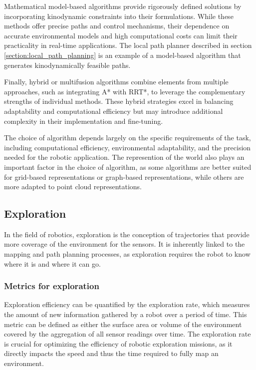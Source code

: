 \documentclass[12pt]{article}
\begin{document}
        Mathematical model-based algorithms provide rigorously defined solutions by incorporating kinodynamic constraints into their formulations. While these methods offer precise paths and control mechanisms, their dependence on accurate environmental models and high computational costs can limit their practicality in real-time applications. The local path planner described in section \ref{section:local_path_planning} is an example of a model-based algorithm that generates kinodynamically feasible paths.
        
        Finally, hybrid or multifusion algorithms combine elements from multiple approaches, such as integrating A* with RRT*, to leverage the complementary strengths of individual methods. These hybrid strategies excel in balancing adaptability and computational efficiency but may introduce additional complexity in their implementation and fine-tuning.
        
        The choice of algorithm depends largely on the specific requirements of the task, including computational efficiency, environmental adaptability, and the precision needed for the robotic application. The represention of the world also plays an important factor in the choice of algorithm, as some algorithms are better suited for grid-based representations or graph-based representations, while others are more adapted to point cloud representations.
        

        

    \subsection{Exploration}

        In the field of robotics, exploration is the conception of trajectories that provide more coverage of the environment for the sensors. It is inherently linked to the mapping and path planning processes, as exploration requires the robot to know where it is and where it can go.  
        
        \subsubsection{Metrics for exploration}
        
        Exploration efficiency can be quantified by the exploration rate, which measures the amount of new information gathered by a robot over a period of time. This metric can be defined as either the surface area or volume of the environment covered by the aggregation of all sensor readings over time. The exploration rate is crucial for optimizing the efficiency of robotic exploration missions, as it directly impacts the speed and thus the time required to fully map an environment. 
\end{document}
